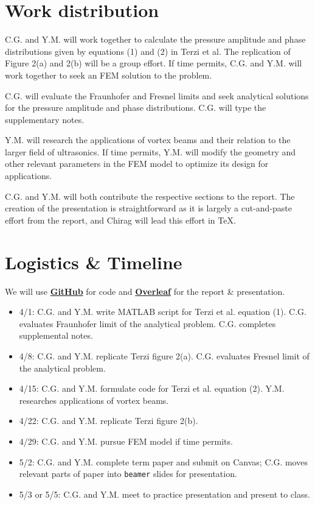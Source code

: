 \documentclass[12pt]{article}%
\begin{document}
\section*{Work distribution}

C.G. and Y.M. will work together to calculate the pressure amplitude and phase distributions given by equations (1) and (2) in Terzi et al. The replication of Figure 2(a) and 2(b) will be a group effort. If time permits, C.G. and Y.M. will work together to seek an FEM solution to the problem.

C.G. will evaluate the Fraunhofer and Fresnel limits and seek analytical solutions for the pressure amplitude and phase distributions. C.G. will type the supplementary notes.

Y.M. will research the applications of vortex beams and their relation to the larger field of ultrasonics. If time permits, Y.M. will modify the geometry and other relevant parameters in the FEM model to optimize its design for applications.

C.G. and Y.M. will both contribute the respective sections to the report. The creation of the presentation is straightforward as it is largely a cut-and-paste effort from the report, and Chirag will lead this effort in \TeX.


\section*{Logistics \& Timeline} 

We will use \textbf{\href{https://github.com/cag170030/Ultrasonics_2022}{GitHub}} for code and \href{https://www.overleaf.com/read/rryhckcywhks}{\textbf{Overleaf}} for the report \& presentation. 

\begin{itemize}
    \item 4/1: C.G. and Y.M. write MATLAB script for Terzi et al. equation (1). C.G. evaluates Fraunhofer limit of the analytical problem. C.G. completes supplemental notes.
    \item 4/8: C.G. and Y.M. replicate Terzi figure 2(a). C.G. evaluates Fresnel limit of the analytical problem.
    \item 4/15: C.G. and Y.M. formulate code for Terzi et al. equation (2). Y.M. researches applications of vortex beams.
    \item 4/22: C.G. and Y.M. replicate Terzi figure 2(b).
    \item 4/29: C.G. and Y.M. pursue FEM model if time permits.  
    \item 5/2: C.G. and Y.M. complete term paper and submit on Canvas; C.G. moves relevant parts of paper into \texttt{beamer} slides for presentation. 
    \item 5/3 or 5/5: C.G. and Y.M. meet to practice presentation and present to class.
\end{itemize}
\end{document}
